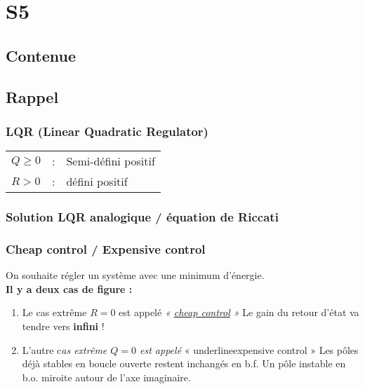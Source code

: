 \documentclass[document.tex]{subfiles}
\begin{document}
\section{S5}

\subsection{Contenue}


\subsection{Rappel}

\subsubsection{LQR (Linear Quadratic Regulator)}


\begin{tabular}{l c l}
$Q \geq 0$ & : & Semi-défini positif \\
$R > 0$ & : & défini positif
\end{tabular}

\subsubsection{Solution LQR analogique / équation de Riccati}

\subsubsection{Cheap control / Expensive control}

On souhaite régler un système avec une minimum d'énergie.\\

\textbf{Il y a deux cas de figure : }
\begin{enumerate}
\item Le cas extrême $R = 0$ est appelé \textit{« \underline{cheap control} »}
Le gain du retour d'état va tendre vers \textbf{infini} !
\item L'autre c\textit{as extrême $Q = 0$ est appelé }« underline{expensive control} »
Les pôles déjà stables en boucle ouverte restent inchangés en b.f.
Un pôle instable en b.o. miroite autour de l'axe imaginaire. \\
\end{enumerate}
\end{document}
